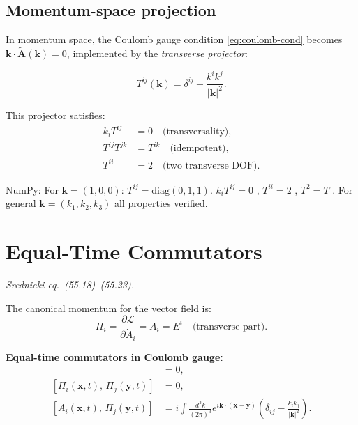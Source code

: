 \documentclass[12pt]{article}
\newcommand{\verified}[1]{\textcolor{verifygreen}{\checkmark\; #1}}
\begin{document}
\subsection{Momentum-space projection}

In momentum space, the Coulomb gauge condition \eqref{eq:coulomb-cond} becomes
$\mathbf{k}\cdot\tilde{\mathbf{A}}(\mathbf{k}) = 0$, implemented by the
\emph{transverse projector}:

\begin{mdframed}[backgroundcolor=blue!5]
\begin{equation}\label{eq:transverse-projector}
  T^{ij}(\mathbf{k}) = \delta^{ij} - \frac{k^i k^j}{|\mathbf{k}|^2}.
\end{equation}
\end{mdframed}

This projector satisfies:
\begin{align}
  k_i T^{ij} &= 0 \quad\text{(transversality)}, \\
  T^{ij}T^{jk} &= T^{ik} \quad\text{(idempotent)}, \\
  T^{ii} &= 2 \quad\text{(two transverse DOF)}.
\end{align}

\begin{mdframed}[backgroundcolor=green!5]
\verified{NumPy:} For $\mathbf{k}=(1,0,0)$: $T^{ij} = \mathrm{diag}(0,1,1)$.
$k_i T^{ij}=0$ \checkmark, $T^{ii}=2$ \checkmark, $T^2=T$ \checkmark.
For general $\mathbf{k}=(k_1,k_2,k_3)$ all properties verified. \checkmark
\end{mdframed}

\section{Equal-Time Commutators}

\textit{Srednicki eq.\ (55.18)--(55.23).}

The canonical momentum for the vector field is:
\begin{equation}
  \Pi_i = \frac{\partial\mathcal{L}}{\partial\dot A_i} = \dot A_i = E^i \quad
  \text{(transverse part)}.
\end{equation}

\begin{mdframed}[backgroundcolor=blue!5]
\textbf{Equal-time commutators in Coulomb gauge:}
\begin{align}
  [A_i(\mathbf{x},t),\, A_j(\mathbf{y},t)] &= 0, \label{eq:comm-AA}\\
  [\Pi_i(\mathbf{x},t),\, \Pi_j(\mathbf{y},t)] &= 0, \label{eq:comm-PP}\\
  [A_i(\mathbf{x},t),\, \Pi_j(\mathbf{y},t)] &= i\int\!\frac{d^3k}{(2\pi)^3}
  e^{i\mathbf{k}\cdot(\mathbf{x}-\mathbf{y})}
  \left(\delta_{ij} - \frac{k_ik_j}{|\mathbf{k}|^2}\right). \label{eq:comm-AP}
\end{align}
\end{mdframed}
\end{document}
